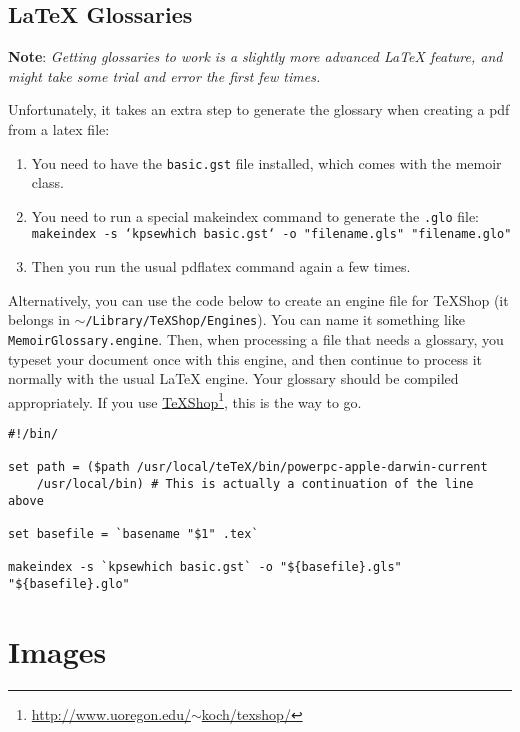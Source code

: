 \subsection{LaTeX Glossaries}
\label{latexglossaries}

\textbf{Note}: \emph{Getting glossaries to work is a slightly more advanced LaTeX
feature, and might take some trial and error the first few times.}

Unfortunately, it takes an extra step to generate the glossary when creating a
pdf from a latex file:

\begin{enumerate}
\item You need to have the \texttt{basic.gst} file installed, which comes with the
memoir class.

\item You need to run a special makeindex command to generate the \texttt{.glo} file:
\texttt{makeindex -s `kpsewhich basic.gst` -o "filename.gls" "filename.glo"}

\item Then you run the usual pdflatex command again a few times.

\end{enumerate}

Alternatively, you can use the code below to create an engine file for TeXShop (it belongs in \texttt{\ensuremath{\sim}\slash{}Library\slash{}TeXShop\slash{}Engines}). You can name it something like \texttt{MemoirGlossary.engine}. Then, when processing a file that needs a glossary, you typeset your document once with this engine, and then continue to process it normally with the usual LaTeX engine. Your glossary should be compiled appropriately. If you use \href{http://www.uoregon.edu/~koch/texshop/}{TeXShop}\footnote{\href{http://www.uoregon.edu/~koch/texshop/}{http:\slash{}\slash{}www.uoregon.edu\slash{}\ensuremath{\sim}koch\slash{}texshop\slash{}}}, this is the way to go.

\begin{verbatim}
#!/bin/	

set path = ($path /usr/local/teTeX/bin/powerpc-apple-darwin-current 
	/usr/local/bin) # This is actually a continuation of the line above

set basefile = `basename "$1" .tex`

makeindex -s `kpsewhich basic.gst` -o "${basefile}.gls" "${basefile}.glo"
\end{verbatim}

\section{Images}
\label{images}


